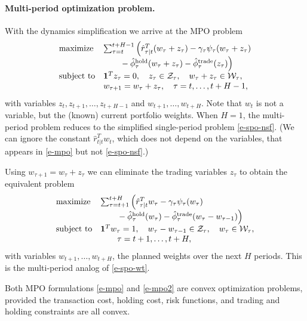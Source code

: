 \documentclass[openany]{article}  %
\newcommand{\trcosthat}{\hat \phi^\mathrm{trade}}
\newcommand{\hldcosthat}{\hat \phi^\mathrm{hold}}
\begin{document}
\paragraph{Multi-period optimization problem.}
With the dynamics simplification we arrive at the MPO problem
\begin{equation}\label{e-mpo}
\begin{array}{ll}
\mbox{maximize} &
\sum_{\tau=t}^{t+H-1}
\Big(\hat r_{\tau|t}^T (w_\tau + z_\tau)
-\gamma_\tau \psi_\tau(w_\tau+z_\tau) \mbox{} \\
& \qquad \mbox{} - \hldcosthat_\tau (w_\tau + z_\tau)
- \trcosthat_\tau (z_\tau) \Big) \\
\mbox{subject to} &
\ones^Tz_\tau = 0, \quad
z_\tau \in \mathcal Z_\tau, \quad
w_\tau + z_\tau \in \mathcal W_\tau, \\
& w_{\tau+1} = w_\tau + z_\tau,
\quad \tau = t,\ldots, t+H-1,
\end{array}
\end{equation}
with variables $z_t, z_{t+1}, \ldots, z_{t+H-1}$ and
$w_{t+1}, \ldots, w_{t+H}$.
Note that $w_t$ is not a variable, but the (known) current portfolio weights.
When $H=1$, the multi-period problem reduces to the simplified
single-period problem \eqref{e-spo-nsf}.
(We can ignore the constant $\hat r_{t|t}^T w_t$, which does not
depend on the variables, that appears
in \eqref{e-mpo} but not \eqref{e-spo-nsf}.)

Using $w_{\tau+1}=w_\tau+z_\tau$
we can eliminate the trading variables $z_\tau$ to obtain the equivalent
problem
\begin{equation}\label{e-mpo2}
\begin{array}{ll}
\mbox{maximize} &
\sum_{\tau=t+1}^{t+H} \Big(\hat r_{\tau|t}^T w_\tau
-\gamma_\tau \psi_\tau(w_\tau) \mbox{}\\
& \qquad \mbox{}  - \hldcosthat_\tau (w_\tau)
- \trcosthat_\tau (w_\tau-w_{\tau-1}) \Big) \\
\mbox{subject to} & \ones^Tw_\tau=1, \quad
w_\tau - w_{\tau-1} \in \mathcal Z_\tau,
\quad w_\tau \in \mathcal W_\tau,\\
& \qquad \tau = t+1, \ldots, t+H,
\end{array}
\end{equation}
with variables $w_{t+1}, \ldots, w_{t+H}$, the planned weights
over the next $H$ periods.
This is the multi-period analog of \eqref{e-spo-wt}.

Both MPO formulations \eqref{e-mpo} and \eqref{e-mpo2} are convex optimization
problems, provided the transaction cost, holding cost, risk functions,
and trading and holding constraints are all convex.
\end{document}
